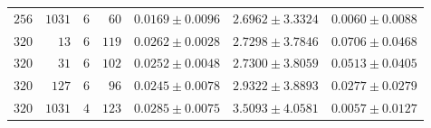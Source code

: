 \begin{tabular}{@{}rrrrrrr@{}}
  $256$ & $1031$ & $6$ & $60$ & $0.0169\mathbin{\pm}0.0096$ & $2.6962\mathbin{\pm}3.3324$ & $0.0060\mathbin{\pm}0.0088$ \\
  $320$ & $13$ & $6$ & $119$ & $0.0262\mathbin{\pm}0.0028$ & $2.7298\mathbin{\pm}3.7846$ & $0.0706\mathbin{\pm}0.0468$ \\
  $320$ & $31$ & $6$ & $102$ & $0.0252\mathbin{\pm}0.0048$ & $2.7300\mathbin{\pm}3.8059$ & $0.0513\mathbin{\pm}0.0405$ \\
  $320$ & $127$ & $6$ & $96$ & $0.0245\mathbin{\pm}0.0078$ & $2.9322\mathbin{\pm}3.8893$ & $0.0277\mathbin{\pm}0.0279$ \\
  $320$ & $1031$ & $4$ & $123$ & $0.0285\mathbin{\pm}0.0075$ & $3.5093\mathbin{\pm}4.0581$ & $0.0057\mathbin{\pm}0.0127$ \\
  \bottomrule
\end{tabular}
